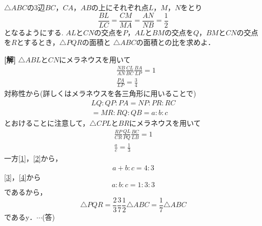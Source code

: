 \documentclass[a4j]{jarticle}
\begin{document}

     \begin{oframed}
     $\triangle ABC$の$3$辺$BC$，$CA$，$AB$の上にそれぞれ点$L$，$M$，$N$をとり
          \[\frac{BL}{LC}=\frac{CM}{MA}=\frac{AN}{NB}=\frac{1}{2}\]
     となるようにする.
     $AL$と$CN$の交点を$P$，$AL$と$BM$の交点を$Q$，$BM$と$CN$の交点を$R$とするとき，$\triangle PQR$の面積と
     $\triangle ABC$の面積との比を求めよ．
     \end{oframed}

\setlength{\columnseprule}{0.4pt}
\begin{multicols}{2}
{\bf[解]} $\triangle ABL$と$CN$にメラネウスを用いて
     \begin{align}
     &\frac{NB}{AN}\frac{CL}{BC}\frac{BA}{LP}=1\nonumber　\\
     &\frac{PA}{LP}=\frac{3}{4}\label{1}
     \end{align}
対称性から(詳しくはメラネウスを各三角形に用いることで)
     \begin{align}
     LQ:QP:PA=NP:PR:RC\nonumber  \\
     =MR:RQ:QB=a:b:c\label{2}
     \end{align}
とおけることに注意して，$\triangle CPL$と$BR$にメラネウスを用いて
     \begin{align}
     \frac{RP}{CR}\frac{QL}{PQ}\frac{BC}{LB}=1 \nonumber\\
     \frac{a}{c}=\frac{1}{3}\label{3}
     \end{align}   
一方\eqref{1}，\eqref{2}から，
     \begin{align}
     a+b:c=4:3 \label{4}
     \end{align}  
\eqref{3}，\eqref{4}から
     \[a:b:c=1:3:3\]
であるから，
     \[\triangle PQR=\frac{2}{3}\frac{3}{7}\frac{1}{2}\triangle ABC=\frac{1}{7}\triangle ABC\]     
であるy．$\cdots$(答)
\newpage
\end{multicols}
\end{document}
